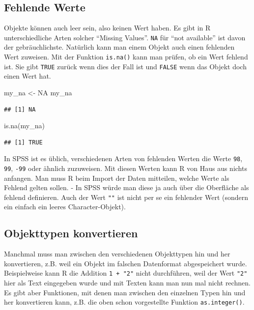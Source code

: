 \documentclass[
]{book}
\newenvironment{Shaded}{\begin{snugshade}}{\end{snugshade}}
\newcommand{\ConstantTok}[1]{\textcolor[rgb]{0.00,0.00,0.00}{#1}}
\newcommand{\FunctionTok}[1]{\textcolor[rgb]{0.00,0.00,0.00}{#1}}
\newcommand{\NormalTok}[1]{#1}
\newcommand{\OtherTok}[1]{\textcolor[rgb]{0.56,0.35,0.01}{#1}}
\begin{document}
\hypertarget{fehlende-werte}{%
\subsection{Fehlende Werte}\label{fehlende-werte}}

Objekte können auch leer sein, also keinen Wert haben. Es gibt in R unterschiedliche Arten solcher ``Missing Values''. \texttt{NA} für ``not available'' ist davon der gebräuchlichste. Natürlich kann man einem Objekt auch einen fehlenden Wert zuweisen. Mit der Funktion \texttt{is.na()} kann man prüfen, ob ein Wert fehlend ist. Sie gibt \texttt{TRUE} zurück wenn dies der Fall ist und \texttt{FALSE} wenn das Objekt doch einen Wert hat.

\begin{Shaded}
\begin{Highlighting}[]
\NormalTok{my\_na }\OtherTok{\textless{}{-}} \ConstantTok{NA}
\NormalTok{my\_na}
\end{Highlighting}
\end{Shaded}

\begin{verbatim}
## [1] NA
\end{verbatim}

\begin{Shaded}
\begin{Highlighting}[]
\FunctionTok{is.na}\NormalTok{(my\_na)}
\end{Highlighting}
\end{Shaded}

\begin{verbatim}
## [1] TRUE
\end{verbatim}

In SPSS ist es üblich, verschiedenen Arten von fehlenden Werten die Werte \texttt{98}, \texttt{99}, \texttt{-99} oder ähnlich zuzuweisen. Mit diesen Werten kann R von Haus aus nichts anfangen. Man muss R beim Import der Daten mitteilen, welche Werte als Fehlend gelten sollen. - In SPSS würde man diese ja auch über die Oberfläche als fehlend definieren. Auch der Wert \texttt{""} ist nicht per se ein fehlender Wert (sondern ein einfach ein leeres Character-Objekt).

\hypertarget{objekttypen-konvertieren}{%
\subsection{Objekttypen konvertieren}\label{objekttypen-konvertieren}}

Manchmal muss man zwischen den verschiedenen Objekttypen hin und her konvertieren, z.B. weil ein Objekt im falschen Datenformat abgespeichert wurde. Beispielweise kann R die Addition \texttt{1\ +\ "2"} nicht durchführen, weil der Wert \texttt{"2"} hier als Text eingegeben wurde und mit Texten kann man nun mal nicht rechnen. Es gibt aber Funktionen, mit denen man zwischen den einzelnen Typen hin und her konvertieren kann, z.B. die oben schon vorgestellte Funktion \texttt{as.integer()}.
\end{document}
